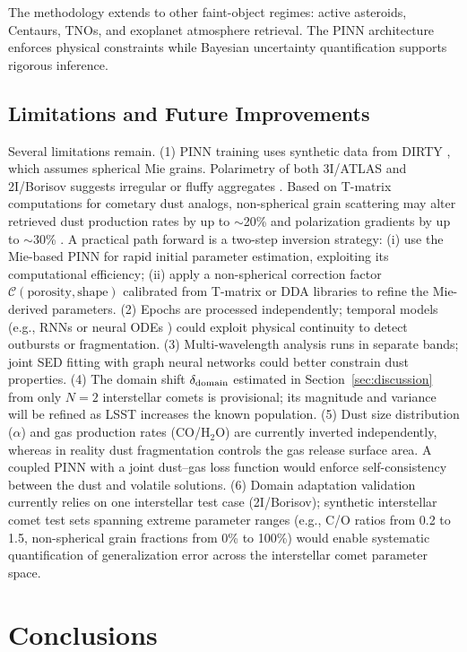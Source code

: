 \documentclass[preprint2]{aastex631}
\begin{document}
The methodology extends to other faint-object regimes: active asteroids, Centaurs, TNOs, and exoplanet atmosphere retrieval. The PINN architecture enforces physical constraints while Bayesian uncertainty quantification supports rigorous inference.

\subsection{Limitations and Future Improvements}

Several limitations remain. (1) PINN training uses synthetic data from DIRTY \citep{gordon01}, which assumes spherical Mie grains. Polarimetry of both 3I/ATLAS and 2I/Borisov suggests irregular or fluffy aggregates \citep{kolokolova04}. Based on T-matrix computations for cometary dust analogs, non-spherical grain scattering may alter retrieved dust production rates by up to $\sim$20\% and polarization gradients by up to $\sim$30\% \citep{kolokolova04,shen11}. A practical path forward is a two-step inversion strategy: (i) use the Mie-based PINN for rapid initial parameter estimation, exploiting its computational efficiency; (ii) apply a non-spherical correction factor $\mathcal{C}(\text{porosity}, \text{shape})$ calibrated from T-matrix or DDA libraries to refine the Mie-derived parameters. (2) Epochs are processed independently; temporal models (e.g., RNNs or neural ODEs \citep{chen18}) could exploit physical continuity to detect outbursts or fragmentation. (3) Multi-wavelength analysis runs in separate bands; joint SED fitting with graph neural networks could better constrain dust properties. (4) The domain shift $\delta_{\rm domain}$ estimated in Section~\ref{sec:discussion} from only $N=2$ interstellar comets is provisional; its magnitude and variance will be refined as LSST increases the known population. (5) Dust size distribution ($\alpha$) and gas production rates (CO/H$_2$O) are currently inverted independently, whereas in reality dust fragmentation controls the gas release surface area. A coupled PINN with a joint dust--gas loss function would enforce self-consistency between the dust and volatile solutions. (6) Domain adaptation validation currently relies on one interstellar test case (2I/Borisov); synthetic interstellar comet test sets spanning extreme parameter ranges (e.g., C/O ratios from 0.2 to 1.5, non-spherical grain fractions from 0\% to 100\%) would enable systematic quantification of generalization error across the interstellar comet parameter space.

\section{Conclusions}\label{sec:conclusions}
\end{document}
